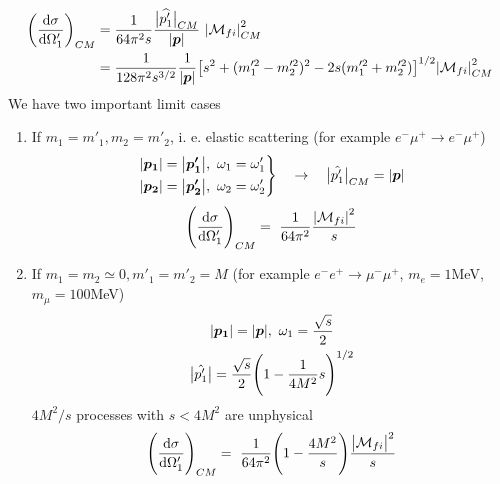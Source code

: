 \documentclass[TheoreticalPhy_ModB.tex]{subfiles}
\begin{document}
\begin{example}[$2 \to 2$ scattering]
\[\begin{split}
\biggl( \frac{\de \sigma}{\de \Omega'_1} \biggr)_{CM} 	
	& = \frac{1}{64 \pi^2 s} \frac{\big\vert{\widehat{p'_1}}\big\vert_{CM}}{\abs{\vec{p}}} \ \abs{\mathM_{fi}}^2_{CM} \\
	& = \frac{1}{128 \pi^2 s^{3/2}} \frac{1}{\abs{\vec{p}}}
		\bigl[s^2 + (m_1^{\prime 2} - m_2^{\prime 2})^2 - 2s(m_1^{\prime 2} + m_2^{\prime 2}) \bigr]^{1/2}
		\abs{\mathM_{fi}}^2_{CM}
\end{split}
\]
We have two important limit cases
\begin{enumerate}[label=(\Alph*)]
\item If $m_1 = m'_1, m_2 = m'_2$, i. e. elastic scattering (for example $e^- \mu^{+} \to e^-\mu^{+}$)
	\begin{equation*}
	\left. \begin{aligned}
	\abs{\boldsymbol{p_1}} = \abs{\boldsymbol{p'_1}},\ \omega_1 = \omega'_1 \\
	\abs{\boldsymbol{p_2}} = \abs{\boldsymbol{p'_2}},\ \omega_2 = \omega'_2
	\end{aligned}
	\right \}\quad\rightarrow
	\quad \big\vert{\hat{p'_1}}\big\vert_{CM} = \abs{\boldsymbol{p}}
	\end{equation*}
	\[
	\Biggl( \frac{\textup{d} \sigma}{\textup{d} \Omega'_1} \Biggr)_{CM} = \ \frac{1}{64 \pi^2} \frac{\abs{\mathcal{M}_{fi}}^2}{s}
	\]
\item If $m_1 = m_2 \simeq 0, m'_1 = m'_2 = M$ (for example $e^-e^+ \to \mu^- \mu^+$, $m_e=1$MeV, $m_\mu=100$MeV)
	\begin{gather}
	\abs{\boldsymbol{p_1}} = \abs{\boldsymbol{p}},\ \omega_1 = \frac{\sqrt{s}}{2} \notag \\
	\big\vert{\hat{p'_1}}\big\vert = \frac{\sqrt{s}}{2} \Biggl( 1 - \frac{1}{4M^2}{s} \Biggr)^{1/2} 
	\end{gather}
$4M^2/s$ processes with $s < 4M^2$ are unphysical
	\[
	\Biggl( \frac{\textup{d} \sigma}{\textup{d} \Omega'_1} \Biggr)_{CM} = \ \frac{1}{64 \pi^2} 
	\Biggl( 1 - \frac{4M^2}{s} \Biggr)
	\frac{\big\vert{\mathcal{M}_{fi}}\big\vert^2}{s}
	\]
\end{enumerate}
\end{example}
\end{document}
